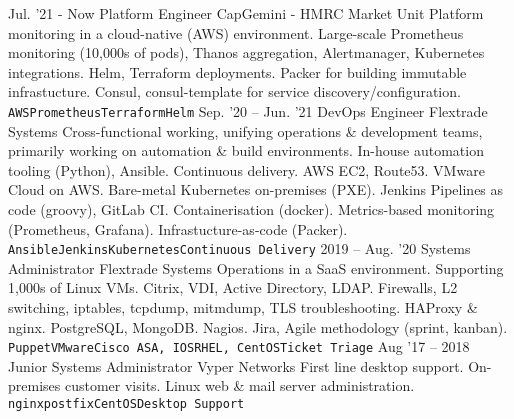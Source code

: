 \documentclass[10pt]{developercv} %
\begin{document}
\vspace{0.5cm}


\begin{entrylist}
  \entry
    {Jul. '21 - Now}
    {Platform Engineer}
    {CapGemini - HMRC Market Unit}
    {Platform monitoring in a cloud-native (AWS) environment. Large-scale Prometheus monitoring (10,000s of pods), Thanos aggregation, Alertmanager, Kubernetes \linebreak integrations. Helm, Terraform deployments. Packer for building immutable \linebreak infrastucture. Consul, consul-template for service discovery/configuration.\\ \texttt{AWS}\slashsep\texttt{Prometheus}\slashsep\texttt{Terraform}\slashsep\texttt{Helm}}
	\entry
		{Sep. '20 -- Jun. '21}
		{DevOps Engineer}
		{Flextrade Systems}
    {Cross-functional working, unifying operations \& development teams, primarily working \linebreak on automation \& build environments. In-house automation tooling (Python), \linebreak Ansible. Continuous delivery. AWS EC2, Route53. VMware Cloud on AWS. Bare-metal \linebreak Kubernetes on-premises (PXE). Jenkins Pipelines as code (groovy), GitLab CI. \linebreak Containerisation (docker). Metrics-based monitoring (Prometheus, Grafana). Infrastucture-as-code (Packer).\\ \texttt{Ansible}\slashsep\texttt{Jenkins}\slashsep\texttt{Kubernetes}\slashsep\texttt{Continuous Delivery}}
	\entry
		{2019 -- Aug. '20}
		{Systems Administrator}
		{Flextrade Systems}
    {Operations in a SaaS environment. Supporting 1,000s of Linux VMs. Citrix, VDI, \linebreak Active Directory, LDAP. Firewalls, L2 switching, iptables, tcpdump, mitmdump, \linebreak TLS troubleshooting. HAProxy \& nginx. PostgreSQL, MongoDB. Nagios. Jira, Agile methodology (sprint, kanban).\\ \texttt{Puppet}\slashsep\texttt{VMware}\slashsep\texttt{Cisco ASA, IOS}\slashsep\texttt{RHEL, CentOS}\slashsep\texttt{Ticket Triage}}
	\entry
		{Aug '17 -- 2018}
		{Junior Systems Administrator}
		{Vyper Networks}
    {First line desktop support. On-premises customer visits. Linux web \& mail server \linebreak administration.\\ \texttt{nginx}\slashsep\texttt{postfix}\slashsep\texttt{CentOS}\slashsep\texttt{Desktop Support}}
\end{entrylist}
\end{document}
